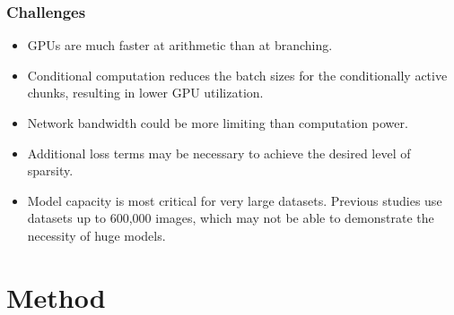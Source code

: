 \documentclass[12pt,aspectratio=169]{beamer}
\begin{document}
    \begin{frame}
        \frametitle{Challenges}

        \begin{itemize}
            \setlength{\itemsep}{.8em}
            \item GPUs are much faster at arithmetic than at branching.
            \item Conditional computation reduces the batch sizes for the conditionally active chunks, resulting in lower GPU utilization.
            \item Network bandwidth could be more limiting than computation power.
            \item Additional loss terms may be necessary to achieve the desired level of sparsity.
            \item Model capacity is most critical for very large datasets. Previous studies use datasets up to 600,000 images, which may not be able to demonstrate the necessity of huge models.
        \end{itemize}
    \end{frame}

    \section{Method}
\end{document}
